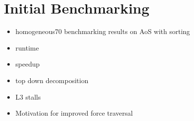 \chapter{Initial Benchmarking}
\label{ch:initial_benchmarking}

\begin{itemize}
    \item homogeneous70 benchmarking results on AoS with sorting
    \item runtime
    \item speedup
    \item top down decomposition
    \item L3 stalls
    \item Motivation for improved force traversal
\end{itemize}



